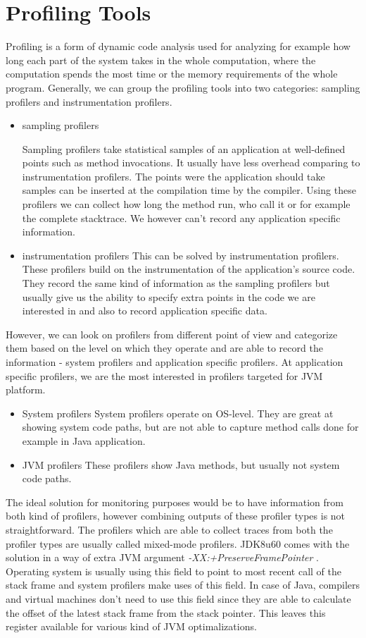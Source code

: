 \section{Profiling Tools}
Profiling is a form of dynamic code analysis used for analyzing for example how long each part of the system takes in the whole computation, where the computation spends the most time or the memory requirements of the whole program. Generally, we can group the profiling tools into two categories: sampling profilers and instrumentation profilers.

\begin{itemize}
	\item sampling profilers

Sampling profilers take statistical samples of an application at well-defined points such as method invocations. It usually have less overhead comparing to instrumentation profilers. The points were the application should take samples can be inserted at the compilation time by the compiler. Using these profilers we can collect how long the method run, who call it or for example the complete stacktrace. We however can't record any application specific information.
\item instrumentation profilers
This can be solved by instrumentation profilers. These profilers build on the instrumentation of the application's source code. They record the same kind of information as the sampling profilers but usually give us the ability to specify extra points in the code we are interested in and also to record application specific data.
\end{itemize}


However, we can look on profilers from different point of view and categorize them based on the level on which they operate and are able to record the information - system profilers and application specific profilers. 
At application specific profilers, we are the most interested in profilers targeted for JVM platform.
\begin{itemize}
	\item System profilers
	System profilers operate on OS-level. They are great at showing system code paths, but are not able to capture method calls done for example in Java application.
	\item JVM profilers
	These profilers show Java methods, but usually not system code paths.
\end{itemize}
The ideal solution for monitoring purposes would be to have information from both kind of profilers, however combining outputs of these profiler types is not straightforward. The profilers which are able to collect traces from both the profiler types are usually called mixed-mode profilers. JDK8u60 comes with the solution in a way of extra JVM argument \textit{-XX:+PreserveFramePointer} \cite{MixedModeProfilers}.  Operating system is usually using this field to point to most recent call of the stack frame and system profilers make uses of this field. In case of Java, compilers and virtual machines don't need to use this field since they are able to calculate the offset of the latest stack frame from the stack pointer. This leaves this register available for various kind of JVM optimalizations.

